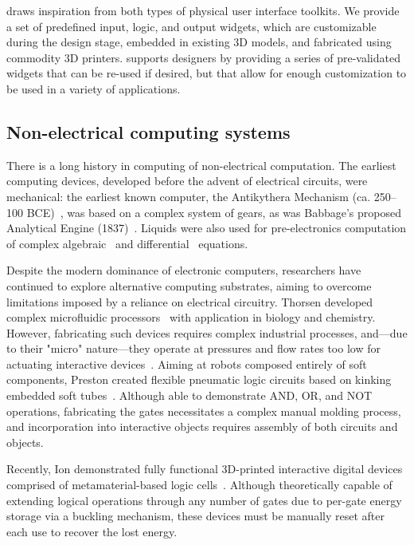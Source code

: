         \al draws inspiration from both types of physical user interface
        toolkits. We provide a set of predefined input, logic, and output
        widgets, which are customizable during the design stage, embedded
        in existing 3D models, and fabricated using commodity 3D printers.
        \al supports designers by providing a series of pre-validated
        widgets that can be re-used if desired, but that allow for enough
        customization to be used in a variety of applications.
        
      \subsection{Non-electrical computing systems}
        There is a long history in computing of non-electrical computation.
        The earliest computing devices, developed before the advent of
        electrical circuits, were mechanical: the earliest known
        computer, the Antikythera Mechanism (ca. 250--100
        BCE)~\cite{Efstathiou:2018}, was based on a complex system of
        gears, as was Babbage's proposed Analytical Engine
        (1837)~\cite{Bromley:1998}. Liquids were also used for
        pre-electronics computation of complex algebraic~\cite{Emch:1901}
        and differential~\cite{Moore:1936} equations.

        Despite the modern dominance of electronic computers, researchers
        have continued to explore alternative computing substrates, aiming
        to overcome limitations imposed by a reliance on electrical
        circuitry. Thorsen \etal developed complex microfluidic
        processors~\cite{Thorsen:2002} with application in biology and
        chemistry. However, fabricating such devices requires complex
        industrial processes, and—due to their "micro" nature—they operate
        at pressures and flow rates too low for actuating interactive
        devices~\cite{Thorsen:2002}. Aiming at robots composed entirely of
        soft components, Preston \etal created flexible pneumatic logic
        circuits based on kinking embedded soft tubes~\cite{Preston:2019b}.
        Although able to demonstrate AND, OR, and NOT operations,
        fabricating the gates necessitates a complex manual molding
        process, and incorporation into interactive objects requires
        assembly of both circuits and objects.
        
        Recently, Ion \etal demonstrated fully functional 3D-printed
        interactive digital devices comprised of metamaterial-based logic
        cells~\cite{Ion:2017}. Although theoretically capable of extending
        logical operations through any number of gates due to per-gate
        energy storage via a buckling mechanism, these devices must be
        manually reset after each use to recover the lost energy.

